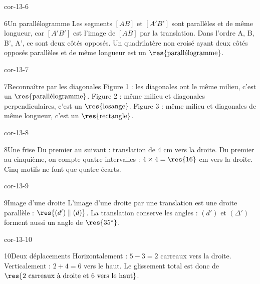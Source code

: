 \begin{blocLivre}{cor-13-6}\begin{corrige}{6}{Un parallélogramme}
Les segments $[AB]$ et $[A'B']$ sont parallèles et de même longueur, car $[A'B']$ est l’image de $[AB]$ par la translation. Dans l’ordre A, B, B’, A’, ce sont deux côtés opposés. Un quadrilatère non croisé ayant deux côtés opposés parallèles et de même longueur est un $\res{\text{parallélogramme}}$.
\label{fig-cor-13-6}
\end{corrige}\end{blocLivre}
\begin{blocLivre}{cor-13-7}\begin{corrige}{7}{Reconnaître par les diagonales}
Figure 1 : les diagonales ont le même milieu, c’est un $\res{\text{parallélogramme}}$. Figure 2 : même milieu et diagonales perpendiculaires, c’est un $\res{\text{losange}}$. Figure 3 : même milieu et diagonales de même longueur, c’est un $\res{\text{rectangle}}$.
\label{fig-cor-13-7}
\end{corrige}\end{blocLivre}
\begin{blocLivre}{cor-13-8}\begin{corrige}{8}{Une frise}
Du premier au suivant : translation de 4 cm vers la droite. Du premier au cinquième, on compte quatre intervalles : $4\times4=\res{16}$ cm vers la droite. Cinq motifs ne font que quatre écarts.
\label{fig-cor-13-8}
\end{corrige}\end{blocLivre}
\begin{blocLivre}{cor-13-9}\begin{corrige}{9}{Image d’une droite}
L’image d’une droite par une translation est une droite parallèle : $\res{(d')\parallel(d)}$. La translation conserve les angles : $(d')$ et $(\Delta')$ forment aussi un angle de $\res{35^\circ}$.
\label{fig-cor-13-9}
\end{corrige}\end{blocLivre}
\begin{blocLivre}{cor-13-10}\begin{corrige}{10}{Deux déplacements}
Horizontalement : $5-3=2$ carreaux vers la droite. Verticalement : $2+4=6$ vers le haut. Le glissement total est donc de $\res{2\text{ carreaux à droite et }6\text{ vers le haut}}$.
\label{fig-cor-13-10}
\end{corrige}\end{blocLivre}
